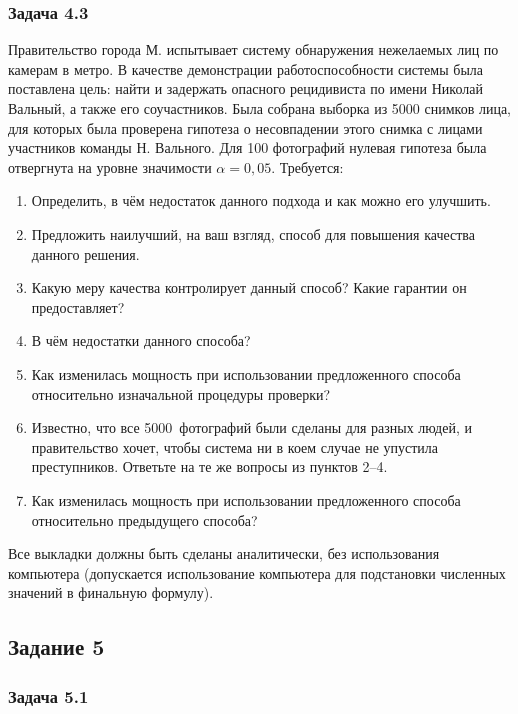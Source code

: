 \subsubsection{Задача 4.3}

Правительство города М. испытывает систему обнаружения нежелаемых лиц по камерам в метро. В качестве демонстрации работоспособности системы была поставлена цель: найти и задержать опасного рецидивиста по имени Николай Вальный, а также его соучастников. Была собрана выборка из 5000 снимков лица, для которых была проверена гипотеза о несовпадении этого снимка с лицами участников команды Н. Вального. Для 100 фотографий нулевая гипотеза была отвергнута на уровне значимости $\alpha=0{,}05$.
Требуется:
\begin{enumerate}
    \item Определить, в чём недостаток данного подхода и как можно его улучшить.
    \item Предложить наилучший, на ваш взгляд, способ для повышения качества данного решения.
    \item Какую меру качества контролирует данный способ? Какие гарантии он предоставляет?
    \item В чём недостатки данного способа?
    \item Как изменилась мощность при использовании предложенного способа относительно изначальной процедуры проверки?
    \item Известно, что все 5000~фотографий были сделаны для разных людей, и правительство хочет, чтобы система ни в коем случае не упустила преступников. Ответьте на те же вопросы из пунктов 2--4.
    \item Как изменилась мощность при использовании предложенного способа относительно предыдущего способа?
\end{enumerate}
Все выкладки должны быть сделаны аналитически, без использования компьютера (допускается использование компьютера для подстановки численных значений в финальную формулу).

\subsection{Задание 5}


\subsubsection{Задача 5.1}

